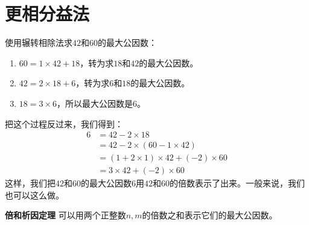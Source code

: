 \documentclass[12pt,UTF8,fontset=none]{ctexbook}
\begin{document}
\section{更相分益法}
使用辗转相除法求$42$和$60$的最大公因数：
\begin{enumerate}
    \item $60 = 1 \times 42 + 18$，转为求$18$和$42$的最大公因数。
    \item $42 = 2 \times 18 + 6$，转为求$6$和$18$的最大公因数。
    \item $18 = 3 \times 6$，所以最大公因数是$6$。
\end{enumerate}
把这个过程反过来，我们得到：
\begin{align*}
    6 &= 42 - 2 \times 18  \\
    &= 42 - 2 \times (60 - 1 \times 42)  \\
    &= (1 + 2\times 1) \times 42 + (-2) \times 60  \\
    &= 3 \times 42 + (-2) \times 60  
\end{align*}
这样，我们把$42$和$60$的最大公因数$6$用$42$和$60$的倍数表示了出来。一般来说，我们也可以这么做。
\begin{tm}{\textbf{倍和析因定理}}\label{tm:5-1-0}
    可以用两个正整数$n,m$的倍数之和表示它们的最大公因数。
\end{tm}
\end{document}
